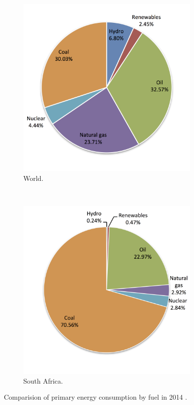 \begin{figure}[htbp]
        \centering                
        \begin{subfigure}[b]{0.45\textwidth}
                \centering
                \includegraphics[width=1\textwidth]{FIG/PrimWorld}
                \caption{World.}\label{PrimWorld}
        \end{subfigure}
        ~
        \begin{subfigure}[b]{0.45\textwidth}
                \centering
                \includegraphics[width=1\textwidth]{FIG/PrimSA}
                \caption{South Africa.}\label{PrimSA}
        \end{subfigure}
\caption[Comparision of primary energy consumption by fuel in 2014.]{Comparision of primary energy consumption by fuel in 2014 \cite{BP2015b}.}\label{PEKreis}
\end{figure}
